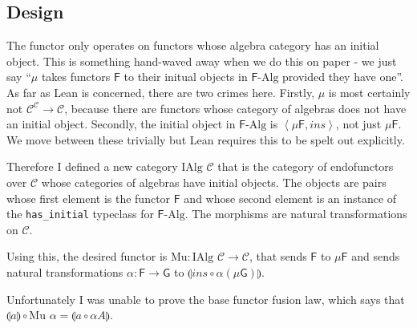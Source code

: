 \documentclass[a4paper, twoside, 11pt]{article}
\theoremstyle{definition}
\theoremstyle{plain}
\theoremstyle{remark}
\newcommand{\alg}[1]{\mathsf{#1}\text{-Alg}}
\newcommand{\fun}[1]{\mathsf{#1}}
\newcommand{\cat}[1]{\mathcal{#1}}
\newcommand{\fix}[1]{\mu\fun{#1}}
\newcommand{\initial}[1]{\left<\fix{#1},ins\right>}
\newcommand{\cata}[1]{\llparenthesis #1 \rrparenthesis}
\newcommand{\ialg}[1]{\text{IAlg }\cat{#1}}
\begin{document}
\subsection{Design}

The functor only operates on functors whose algebra category has an initial object. This is something hand-waved away when we do this on paper - we just say ``$\mu$ takes functors $\fun{F}$ to their initual objects in $\alg{F}$ provided they have one''. As far as Lean is concerned, there are two crimes here. Firstly, $\mu$ is most certainly not $\cat{C}^{\cat{C}} \to \cat{C}$, because there are functors whose category of algebras does not have an initial object. Secondly, the initial object in $\alg{F}$ is $\initial{F}$, not just $\fix{F}$. We move between these trivially but Lean requires this to be spelt out explicitly.

Therefore I defined a new category $\ialg{C}$ that is the category of endofunctors over $\cat{C}$ whose categories of algebras have initial objects. The objects are pairs whose first element is the functor $\fun{F}$ and whose second element is an instance of the \texttt{has\_initial} typeclass for $\alg{F}$. The morphisms are natural transformations on $\cat{C}$.

Using this, the desired functor is $\text{Mu} : \ialg{C} \to \cat{C}$, that sends $\fun{F}$ to $\fix{F}$ and sends natural transformations $\alpha : \fun{F} \to \fun{G}$ to $\cata{ins \circ \alpha(\fix{G})}$.

Unfortunately I was unable to prove the base functor fusion law, which says that $\cata{a} \circ \text{Mu } \alpha = \cata{a \circ \alpha A}$.
\end{document}
